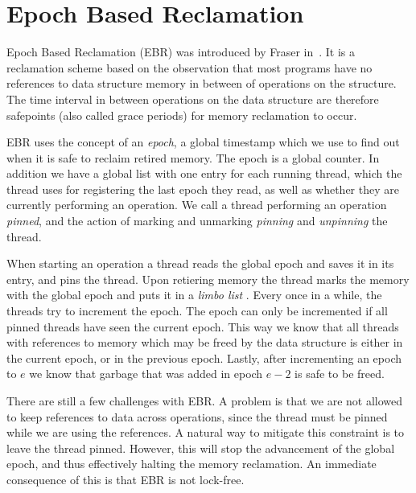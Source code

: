 \documentclass[b5paper,twoside]{report}
\begin{document}
\section{Epoch Based Reclamation}
Epoch Based Reclamation (EBR) was introduced by Fraser in~\cite{fraser2004practical}.
It is a reclamation scheme based on the observation that most programs have no
references to data structure memory in between of operations on the structure.
The time interval in between operations on the data structure are therefore
safepoints (also called grace periods) for memory reclamation to occur.

EBR uses the concept of an \emph{epoch}, a global timestamp which we
use to find out when it is safe to reclaim retired memory.
The epoch is a global counter.
In addition we have a global list with one entry for each running thread,
which the thread uses for registering the last epoch they read, as well as
whether they are currently performing an operation.
We call a thread performing an operation \emph{pinned}, and the action of
marking and unmarking \emph{pinning} and \emph{unpinning} the thread.

When starting an operation a thread reads the global epoch and saves it
in its entry, and pins the thread.
Upon retiering memory the thread marks the memory with the global epoch
and puts it in a \emph{limbo list} .
Every once in a while, the threads try to increment the epoch.
The epoch can only be incremented if all pinned threads
have seen the current epoch. This way we know that all threads
with references to memory which may be freed by the data structure
is either in the current epoch, or in the previous epoch.
Lastly, after incrementing an epoch to $e$ we know that garbage that
was added in epoch $e-2$ is safe to be freed.


There are still a few challenges with EBR.
A problem is that we are not allowed to keep references to data across operations,
since the thread must be pinned while we are using the references.
A natural way to mitigate this constraint is to leave the thread pinned.
However, this will stop the advancement of the global epoch, and thus effectively
halting the memory reclamation.
An immediate consequence of this is that EBR is not lock-free.
\end{document}
